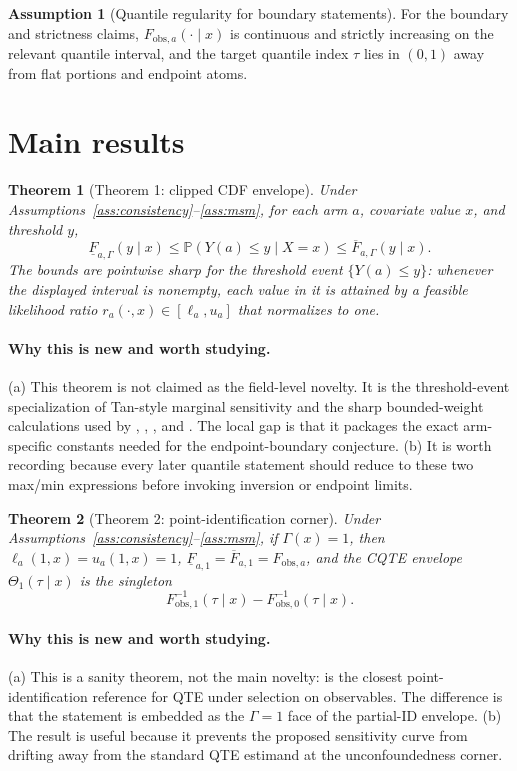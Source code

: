 \documentclass[11pt]{article}
\renewcommand{\Pr}{\mathbb{P}}
\theoremstyle{definition}
\newtheorem{assumption}{Assumption}
\theoremstyle{plain}
\newtheorem{theorem}{Theorem}
\theoremstyle{remark}
\begin{document}
\begin{assumption}[Quantile regularity for boundary statements]\label{ass:regular-quantile}
For the boundary and strictness claims, \(F_{\mathrm{obs},a}(\cdot\mid x)\) is continuous and strictly increasing on the relevant quantile interval, and the target quantile index \(\tau\) lies in \((0,1)\) away from flat portions and endpoint atoms.
\end{assumption}

\section{Main results}
\begin{theorem}[Theorem 1: clipped CDF envelope]\label{thm:cdf-envelope}
Under Assumptions~\ref{ass:consistency}--\ref{ass:msm}, for each arm \(a\), covariate value \(x\), and threshold \(y\),
\[
\underline F_{a,\Gamma}(y\mid x)
\le
\Pr(Y(a)\le y\mid X=x)
\le
\overline F_{a,\Gamma}(y\mid x).
\]
The bounds are pointwise sharp for the threshold event \(\{Y(a)\le y\}\): whenever the displayed interval is nonempty, each value in it is attained by a feasible likelihood ratio \(r_a(\cdot,x)\in[\ell_a,u_a]\) that normalizes to one.
\end{theorem}
\paragraph{Why this is new and worth studying.}
(a) This theorem is not claimed as the field-level novelty.  It is the threshold-event specialization of Tan-style marginal sensitivity and the sharp bounded-weight calculations used by \citet{DornGuo2023}, \citet{Tan2024}, \citet{MastenPoirierRen2025}, and \citet{Wang2026}.  The local gap is that it packages the exact arm-specific constants needed for the endpoint-boundary conjecture.  (b) It is worth recording because every later quantile statement should reduce to these two max/min expressions before invoking inversion or endpoint limits.

\begin{theorem}[Theorem 2: point-identification corner]\label{thm:point-id-corner}
Under Assumptions~\ref{ass:consistency}--\ref{ass:msm}, if \(\Gamma(x)=1\), then \(\ell_a(1,x)=u_a(1,x)=1\), \(\underline F_{a,1}=\overline F_{a,1}=F_{\mathrm{obs},a}\), and the CQTE envelope \(\Theta_{1}(\tau\mid x)\) is the singleton
\[
F_{\mathrm{obs},1}^{-1}(\tau\mid x)-F_{\mathrm{obs},0}^{-1}(\tau\mid x).
\]
\end{theorem}
\paragraph{Why this is new and worth studying.}
(a) This is a sanity theorem, not the main novelty: \citet{Firpo2007} is the closest point-identification reference for QTE under selection on observables.  The difference is that the statement is embedded as the \(\Gamma=1\) face of the partial-ID envelope.  (b) The result is useful because it prevents the proposed sensitivity curve from drifting away from the standard QTE estimand at the unconfoundedness corner.
\end{document}
